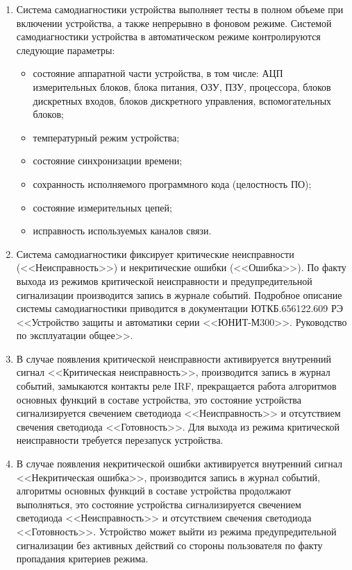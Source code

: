 \begin{enumerate}
\begin{enumerate}
\item
Система самодиагностики устройства выполняет тесты в полном объеме при включении устройства, а также непрерывно в фоновом режиме.
Системой самодиагностики устройства в автоматическом режиме контролируются следующие параметры:
\begin{itemize}
\item состояние аппаратной части устройства, в том числе: АЦП измерительных блоков, блока питания, ОЗУ, ПЗУ, процессора, блоков дискретных входов, блоков дискретного управления, вспомогательных блоков;
\item температурный режим устройства;
\item состояние синхронизации времени;
\item сохранность исполняемого программного кода (целостность ПО);
\item состояние измерительных цепей;
\item исправность используемых каналов связи.
\end{itemize}

\item
Система самодиагностики фиксирует критические неисправности (<<Неисправность>>) и некритические ошибки (<<Ошибка>>). По факту выхода из режимов критической неисправности и предупредительной сигнализации производится запись в журнале событий. Подробное описание системы самодиагностики приводится в документации ЮТКБ.656122.609 РЭ <<Устройство защиты и автоматики серии <<ЮНИТ-М300>>. Руководство по эксплуатации общее>>.

\item
В случае появления критической неисправности активируется внутренний сигнал <<Критическая неисправность>>, производится запись в журнал событий, замыкаются контакты реле IRF, прекращается работа алгоритмов основных функций в составе устройства, это состояние устройства сигнализируется свечением светодиода <<Неисправность>> и отсутствием свечения светодиода <<Готовность>>. Для выхода из режима критической неисправности требуется перезапуск устройства.

\item
В случае появления некритической ошибки активируется внутренний сигнал <<Некритическая ошибка>>, производится запись в журнал событий, алгоритмы основных функций в составе устройства продолжают выполняться, это состояние устройства сигнализируется свечением светодиода <<Неисправность>> и отсутствием свечения светодиода <<Готовность>>. Устройство может выйти из режима предупредительной сигнализации без активных действий со стороны пользователя по факту пропадания критериев режима.


\end{enumerate}
\end{enumerate}

